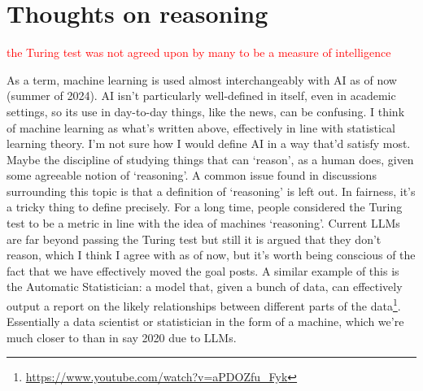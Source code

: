 \documentclass[11pt]{article}
\begin{document}
\section*{Thoughts on reasoning}

\textcolor{red}{the Turing test was not agreed upon by many to be a measure of intelligence}

As a term, machine learning is used almost interchangeably with AI as of now (summer of 2024). AI isn't particularly well-defined in itself, even in academic settings, so its use in day-to-day things, like the news, can be confusing. I think of machine learning as what's written above, effectively in line with statistical learning theory. I'm not sure how I would define AI in a way that'd satisfy most. Maybe the discipline of studying things that can `reason', as a human does, given some agreeable notion of `reasoning'. A common issue found in discussions surrounding this topic is that a definition of `reasoning' is left out. In fairness, it's a tricky thing to define precisely. For a long time, people considered the Turing test to be a metric in line with the idea of machines `reasoning'. Current LLMs are far beyond passing the Turing test but still it is argued that they don't reason, which I think I agree with as of now, but it's worth being conscious of the fact that we have effectively moved the goal posts. A similar example of this is the Automatic Statistician: a model that, given a bunch of data, can effectively output a report on the likely relationships between different parts of the data\footnote{\url{https://www.youtube.com/watch?v=aPDOZfu_Fyk}}. Essentially a data scientist or statistician in the form of a machine, which we're much closer to than in say 2020 due to LLMs.
\end{document}

